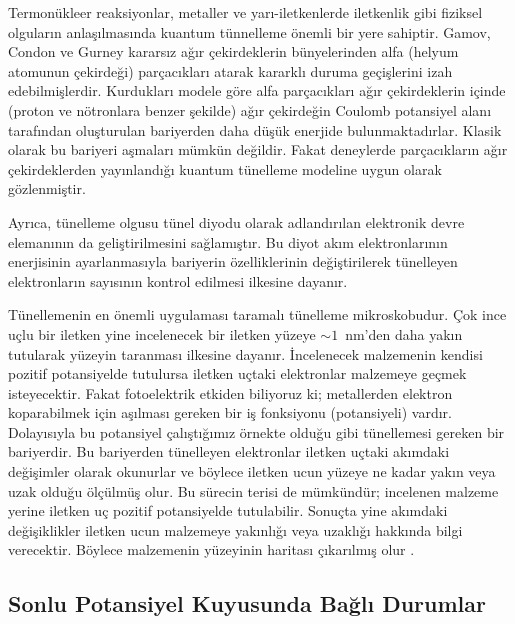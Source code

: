 \documentclass[a4paper,12pt, twoside]{article}
\begin{document}
Termonükleer reaksiyonlar, metaller ve yarı-iletkenlerde iletkenlik gibi
fiziksel olguların anlaşılmasında kuantum tünnelleme önemli bir yere sahiptir. 
Gamov, Condon ve Gurney kararsız ağır çekirdeklerin bünyelerinden alfa (helyum atomunun çekirdeği) parçacıkları atarak kararklı duruma geçişlerini izah edebilmişlerdir. Kurdukları modele göre alfa parçacıkları ağır çekirdeklerin içinde (proton ve nötronlara benzer şekilde) 
ağır çekirdeğin Coulomb potansiyel alanı tarafından oluşturulan bariyerden daha düşük enerjide
bulunmaktadırlar. Klasik olarak bu bariyeri aşmaları mümkün değildir. Fakat deneylerde parçacıkların ağır çekirdeklerden yayınlandığı kuantum tünelleme modeline uygun olarak gözlenmiştir. 

Ayrıca, tünelleme olgusu tünel diyodu olarak adlandırılan elektronik devre elemanının da geliştirilmesini sağlamıştır. Bu diyot akım elektronlarının enerjisinin ayarlanmasıyla bariyerin özelliklerinin değiştirilerek tünelleyen elektronların sayısının kontrol edilmesi ilkesine dayanır.

Tünellemenin en önemli uygulaması taramalı tünelleme mikroskobudur. Çok ince uçlu bir iletken yine incelenecek bir iletken yüzeye $\sim1$~nm'den daha yakın tutularak yüzeyin taranması ilkesine dayanır. İncelenecek malzemenin kendisi pozitif potansiyelde tutulursa iletken uçtaki elektronlar malzemeye geçmek isteyecektir. Fakat fotoelektrik etkiden biliyoruz ki; metallerden elektron koparabilmek için aşılması gereken bir iş fonksiyonu (potansiyeli) vardır. Dolayısıyla bu potansiyel çalıştığımız örnekte olduğu gibi tünellemesi gereken bir bariyerdir. Bu bariyerden tünelleyen elektronlar iletken uçtaki akımdaki değişimler olarak okunurlar ve böylece iletken ucun yüzeye ne kadar yakın veya uzak olduğu ölçülmüş olur. Bu sürecin terisi de mümkündür; incelenen malzeme yerine iletken uç pozitif potansiyelde tutulabilir. Sonuçta yine akımdaki değişiklikler iletken ucun malzemeye yakınlığı veya uzaklığı hakkında bilgi verecektir. Böylece malzemenin yüzeyinin haritası çıkarılmış olur \cite{book:Ficek}.


\subsection{Sonlu Potansiyel Kuyusunda Bağlı Durumlar}
\end{document}
